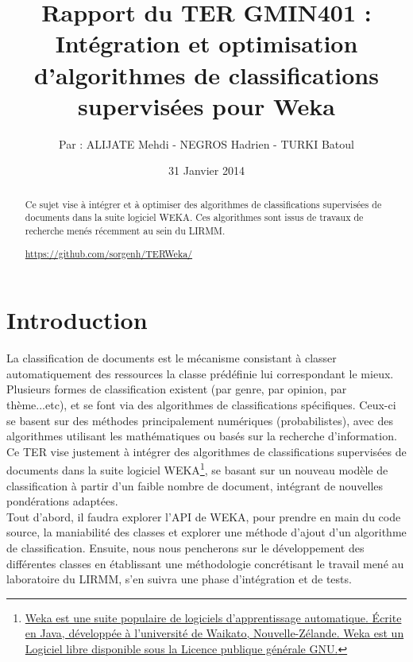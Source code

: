\documentclass{article}
\title{Rapport du TER GMIN401 :\\ \textbf{Intégration et optimisation d’algorithmes de classifications supervisées pour Weka}}
\author{Par : ALIJATE Mehdi - NEGROS Hadrien - TURKI Batoul}
\date{31 Janvier 2014}
\begin{document}
\maketitle
\tableofcontents

\begin{abstract}
	
Ce sujet vise à intégrer et à optimiser des algorithmes de classifications supervisées de documents dans la suite logiciel WEKA. Ces algorithmes sont issus de travaux de recherche menés récemment au sein du LIRMM.
\begin{center}
\href{https://github.com/sorgenh/TERWeka/}{https://github.com/sorgenh/TERWeka/}
\end{center}
\end{abstract}

\newpage 
\section{Introduction}\label{sec:intro}
La classification de documents est le mécanisme consistant à classer automatiquement des ressources la classe prédéfinie lui correspondant le mieux.\\
Plusieurs formes de classification existent (par genre, par opinion, par thème...etc), et se font via des algorithmes de classifications spécifiques. Ceux-ci se basent sur des méthodes principalement numériques (probabilistes), avec des algorithmes utilisant les mathématiques ou basés sur la recherche d'information. \\
Ce TER vise justement à intégrer des algorithmes de classifications supervisées de documents dans la suite logiciel WEKA\footnote{\href{http://www.cs.waikato.ac.nz/~ml/weka/}{Weka est une suite populaire de logiciels d'apprentissage automatique. Écrite en Java, développée à l'université de Waikato, Nouvelle-Zélande. Weka est un Logiciel libre disponible sous la Licence publique générale GNU.}}, se basant sur un nouveau modèle de classification à partir d'un faible nombre de document, intégrant de nouvelles pondérations adaptées.\\
Tout d'abord, il faudra explorer l'API de WEKA, pour prendre en main du code source, la maniabilité des classes et explorer une méthode d'ajout d'un algorithme de classification. Ensuite, nous nous pencherons sur le développement des différentes classes en établissant une méthodologie concrétisant le travail mené au laboratoire du LIRMM, s'en suivra une phase d'intégration et de tests.
\end{document}
